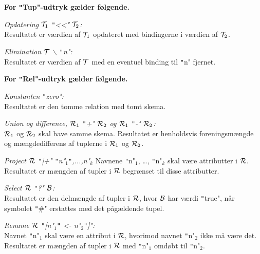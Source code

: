 \documentclass{article}
\newcounter{eks}
\begin{document}


{\bf For \texttt"Tup"-udtryk g\ae{}lder f\o{}lgende.}

{\em Opdatering ${\cal T}_1$ \texttt"<<" ${\cal T}_2$:}\\
Resultatet er v\ae{}rdien af ${\cal T}_1$ opdateret med
bindingerne i v\ae{}rdien af ${\cal T}_2$.

{\em Elimination $\cal T$ $\backslash$ \texttt"n":}\\
Resultatet er v\ae{}rdien af $\cal T$ med en eventuel binding
til \texttt"n" fjernet.

{\bf For \texttt"Rel"-udtryk g\ae{}lder f\o{}lgende.}

{\em Konstanten \texttt"zero":}\\
Resultatet er den tomme relation med tomt skema.

{\em Union og difference, ${\cal R}_1$ \texttt"+" ${\cal R}_2$ og
${\cal R}_1$ \texttt"-" ${\cal R}_2$:}\\
${\cal R}_1$ og ${\cal R}_2$ skal have samme skema. Resultatet er
henholdsvis foreningsm\ae{}ngde og m\ae{}ngdedifferens af tuplerne
i ${\cal R}_1$ og ${\cal R}_2$.

{\em Project $\cal R$ \texttt"|+" \texttt"n"$_1$\texttt",...,n"$_k$}
Navnene \texttt"n"$_1$, \ldots, \texttt"n"$_k$ skal v\ae{}re attributter
i $\cal R$. Resultatet er m\ae{}ngden af tupler i $\cal R$ begr\ae{}nset
til disse attributter.

{\em Select $\cal R$ \texttt"?" $\cal B$:}\\
Resultatet er den delm\ae{}ngde af tupler i $\cal R$, hvor
$\cal B$ har v\ae{}rdi \texttt"true", n\aa{}r symbolet \texttt"#" erstattes
med det p\aa{}g\ae{}ldende tupel.

{\em Rename $\cal R$ \texttt"[n"$_1$\texttt" <- n"$_2$\texttt"]":}\\
Navnet \texttt"n"$_1$ skal v\ae{}re en attribut i $\cal R$, hvorimod
navnet \texttt"n"$_2$ ikke m\aa{} v\ae{}re det. Resultatet er
m\ae{}ngden af tupler i $\cal R$ med \texttt"n"$_1$ omd\o{}bt
til \texttt"n"$_2$.
\end{document}
